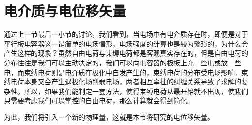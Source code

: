\section{电介质与电位移矢量}
通过上一节最后一小节的讨论，我们看到，当电场中有电介质存在时，即便是对于平行板电容器这一最简单的电场情形，电场强度的计算也是较为繁琐的，为什么会产生这样的现象？虽然自由电荷与束缚电荷都是客观真实存在的，但是自由电荷的分布往往是我们可以主动决定的，我们可以向电容器的极板上充一些电或放一些电，而束缚电荷则是电介质在极化中自发产生的，束缚电荷的分布受电场影响，束缚电荷本身又会产生退极化场削弱电场，两者相互牵扯的纠缠关系导致了求解的复杂性。所以，如果我们能制定一套方法，使得束缚电荷从最开始就不出现，使我们只需要考虑我们可以掌控的自由电荷，那么计算就会得到简化。

为此，我们将引入一个新的物理量，这就是本节将研究的电位移矢量。


